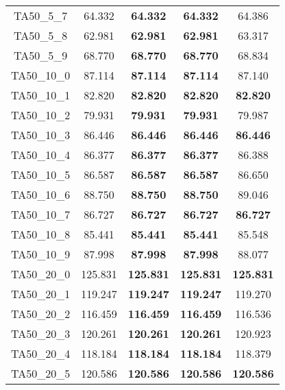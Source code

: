 \begin{tabular}{cc|cc|c}
TA50\_5\_7         & 64.332           & {\bf 64.332}     & {\bf 64.332}     & 64.386          \\ 
TA50\_5\_8         & 62.981           & {\bf 62.981}     & {\bf 62.981}     & 63.317          \\ 
TA50\_5\_9         & 68.770           & {\bf 68.770}     & {\bf 68.770}     & 68.834          \\ 
TA50\_10\_0        & 87.114           & {\bf 87.114}     & {\bf 87.114}     & 87.140          \\ 
TA50\_10\_1        & 82.820           & {\bf 82.820}     & {\bf 82.820}     & {\bf 82.820}    \\ 
TA50\_10\_2        & 79.931           & {\bf 79.931}     & {\bf 79.931}     & 79.987          \\ 
TA50\_10\_3        & 86.446           & {\bf 86.446}     & {\bf 86.446}     & {\bf 86.446}    \\ 
TA50\_10\_4        & 86.377           & {\bf 86.377}     & {\bf 86.377}     & 86.388          \\ 
TA50\_10\_5        & 86.587           & {\bf 86.587}     & {\bf 86.587}     & 86.650          \\ 
TA50\_10\_6        & 88.750           & {\bf 88.750}     & {\bf 88.750}     & 89.046          \\ 
TA50\_10\_7        & 86.727           & {\bf 86.727}     & {\bf 86.727}     & {\bf 86.727}    \\ 
TA50\_10\_8        & 85.441           & {\bf 85.441}     & {\bf 85.441}     & 85.548          \\ 
TA50\_10\_9        & 87.998           & {\bf 87.998}     & {\bf 87.998}     & 88.077          \\ 
TA50\_20\_0        & 125.831          & {\bf 125.831}    & {\bf 125.831}    & {\bf 125.831}   \\ 
TA50\_20\_1        & 119.247          & {\bf 119.247}    & {\bf 119.247}    & 119.270         \\ 
TA50\_20\_2        & 116.459          & {\bf 116.459}    & {\bf 116.459}    & 116.536         \\ 
TA50\_20\_3        & 120.261          & {\bf 120.261}    & {\bf 120.261}    & 120.923         \\ 
TA50\_20\_4        & 118.184          & {\bf 118.184}    & {\bf 118.184}    & 118.379         \\ 
TA50\_20\_5        & 120.586          & {\bf 120.586}    & {\bf 120.586}    & {\bf 120.586}   \\ 

\end{tabular}
